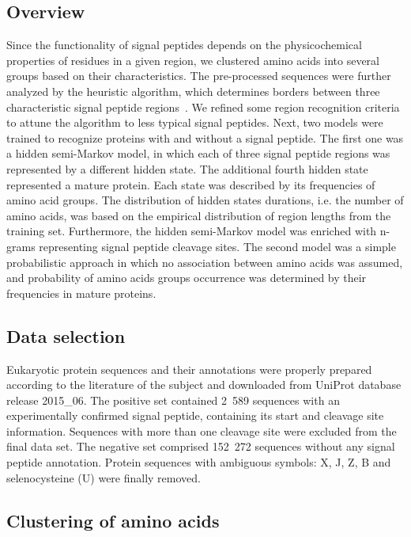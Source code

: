 \documentclass[10pt,letterpaper]{article}
\begin{document}
\subsection*{Overview}

Since the functionality of signal peptides depends on the physicochemical properties of residues in a given region, we clustered amino acids into several groups based on their characteristics. The pre-processed sequences were further analyzed by the heuristic algorithm, which determines borders between three characteristic signal peptide regions~\cite{1998nielsenprediction}. We refined some region recognition criteria to attune the algorithm to less typical signal peptides. Next, two models were trained to recognize proteins with and without a signal peptide. The first one was a hidden semi-Markov model, in which each of three signal peptide regions was represented by a different hidden state. The additional fourth hidden state represented a mature protein. Each state was described by its frequencies of amino acid groups. The distribution of hidden states durations, i.e. the number of amino acids, was based on the empirical distribution of region lengths from the training set. Furthermore, the hidden semi-Markov model was enriched with n-grams representing signal peptide cleavage sites. The second model was a simple probabilistic approach in which no association between amino acids was assumed, and probability of amino acids groups occurrence was determined by their frequencies in mature proteins.

\subsection*{Data selection}

Eukaryotic protein sequences and their annotations were properly prepared according to the literature of the subject and downloaded from UniProt database release 2015\_06. The positive set contained 2~589 sequences with an experimentally confirmed signal peptide, containing its start and cleavage site information. Sequences with more than one cleavage site were excluded from the final data set. The negative set comprised 152~272 sequences without any signal peptide annotation. Protein sequences with ambiguous symbols: X, J, Z, B and selenocysteine (U) were finally removed.

\subsection*{Clustering of amino acids}
\end{document}
